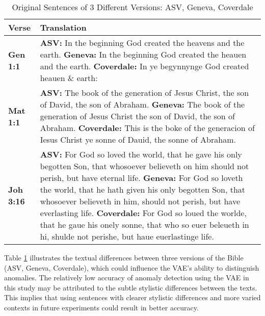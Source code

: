 \begin{table}[t]
\caption{Original Sentences of 3 Different Versions: ASV, Geneva, Coverdale}
\label{tab:verses}
\vskip 0.15in
\begin{center}
\begin{small}
\begin{sc}
\begin{tabularx}{0.45\textwidth}{lX}
\toprule
\textbf{Verse} & \textbf{Translation} \\
\midrule
\textbf{Gen 1:1} & \textbf{ASV:} In the beginning God created the heavens and the earth. \newline
\textbf{Geneva:} In the beginning God created the heauen and the earth. \newline
\textbf{Coverdale:} In ye begynnynge God created heauen \& earth: \\
\midrule
\textbf{Mat 1:1} & \textbf{ASV:} The book of the generation of Jesus Christ, the son of David, the son of Abraham. \newline
\textbf{Geneva:} The book of the generation of Jesus Christ the son of David, the son of Abraham. \newline
\textbf{Coverdale:} This is the boke of the generacion of Iesus Christ ye sonne of Dauid, the sonne of Abraham. \\
\midrule
\textbf{Joh 3:16} & \textbf{ASV:} For God so loved the world, that he gave his only begotten Son, that whosoever believeth on him should not perish, but have eternal life. \newline
\textbf{Geneva:} For God so loveth the world, that he hath given his only begotten Son, that whosoever believeth in him, should not perish, but have everlasting life. \newline
\textbf{Coverdale:} For God so loued the worlde, that he gaue his onely sonne, that who so euer beleueth in hi, shulde not perishe, but haue euerlastinge life. \\
\bottomrule
\end{tabularx}
\end{sc}
\end{small}
\end{center}
\vskip -0.1in
\end{table}

Table \ref{tab:verses} illustrates the textual differences between three versions of the Bible (ASV, Geneva, Coverdale), which could influence the VAE's ability to distinguish anomalies. The relatively low accuracy of anomaly detection using the VAE in this study may be attributed to the subtle stylistic differences between the texts. This implies that using sentences with clearer stylistic differences and more varied contexts in future experiments could result in better accuracy.